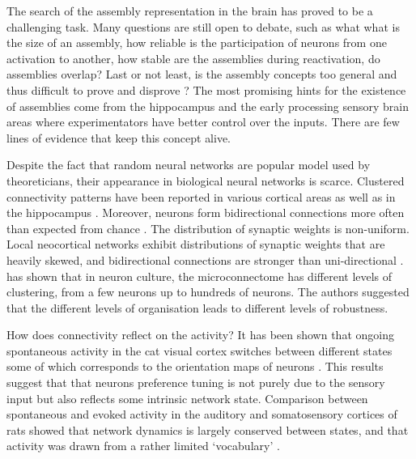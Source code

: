     The search of the assembly representation in the brain has proved to be a
    challenging task. Many questions are still open to debate, such as what
    what is the size of an assembly, how reliable is the participation of
    neurons from one activation to another, how stable are the assemblies
    during reactivation, do assemblies overlap? Last or not least, is the
    assembly concepts too general and thus difficult to prove and disprove
    \citep{Wallace2010}? The most promising hints for the existence of
    assemblies come from the hippocampus and the early processing sensory brain
    areas where experimentators have better control over the inputs. There are
    few lines of evidence that keep this concept alive.

    Despite the fact that random neural networks are popular model used by
    theoreticians, their appearance in biological neural networks is scarce.
    Clustered connectivity patterns have been reported in various cortical
    areas \citep{Song2005, Ko2011, Perin2011, Shimono2015} as well as in the
    hippocampus \citep{Takahashi2010, Guzman2016}. Moreover, neurons form
    bidirectional connections more often than expected from chance
    \citep{Markram1997, Song2005, Takahashi2010, Ko2011, Perin2011}. The
    distribution of synaptic weights is non-uniform. Local neocortical networks
    exhibit distributions of synaptic weights that are heavily skewed, and
    bidirectional connections are stronger than uni-directional
    \citep{Markram1997, Song2005, Buzsaki2014}. \cite{Shimono2015} has shown that
    in neuron culture, the microconnectome has different levels of clustering,
    from a few neurons up to hundreds of neurons. The authors suggested that
    the different levels of organisation leads to different levels of
    robustness.

    How does connectivity reflect on the activity? It has been shown that
    ongoing spontaneous activity in the cat visual cortex switches between
    different states some of which corresponds to the orientation maps of
    neurons \citep{Kenet2003}. This results suggest that that neurons
    preference tuning is not purely due to the sensory input but also reflects
    some intrinsic network state. Comparison between spontaneous and evoked
    activity in the auditory and somatosensory cortices of rats showed that
    network dynamics is largely conserved between states, and that activity was
    drawn from a rather limited `vocabulary' \citep{Luczak2009, Luczak2012}.
    
